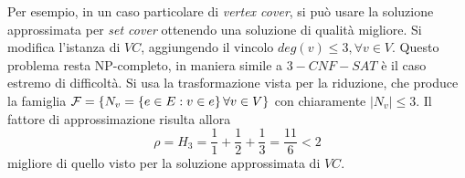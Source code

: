 Per esempio, in un caso particolare di \emph{vertex cover}, si può usare la soluzione approssimata per \emph{set cover} ottenendo una soluzione di qualità migliore.
Si modifica l'istanza di $VC$, aggiungendo il vincolo $
deg(v) \leq 3, \forall v \in V
$.
Questo problema resta NP-completo, in maniera simile a $3-CNF-SAT$ è il caso estremo di difficoltà.
Si usa la trasformazione vista per la riduzione, che produce la famiglia
$
        \mathcal{F} = 
        \left\{ N_v = \left\{ 
                e \in E : v \in e
            \right\}
            \forall v \in V
        \right\}
$
con chiaramente $|N_v| \leq 3$.
Il fattore di approssimazione risulta allora
\begin{equation*}
    \rho = H_3 =
    \frac{1}{1} +
    \frac{1}{2} +
    \frac{1}{3} = 
    \frac{11}{6} < 2
\end{equation*}
migliore di quello visto per la soluzione approssimata di $VC$.

